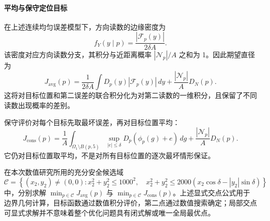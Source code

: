 \paragraph{平均与保守定位目标}
在上述连续均匀误差模型下，方向读数的边缘密度为
\begin{equation}
f_Y(y\mid p)=\frac{|\mathcal F_p(y)|}{2\delta A}.
\end{equation}
该密度对应方向读数分支，其积分与近距离概率 $|\mathcal N_p|/A$ 之和为 1。因此期望直径为
\begin{equation}
J_{\mathrm{avg}}(p)=\frac1{2\delta A}\int D_p(y)|\mathcal F_p(y)|\,dy
+\frac{|\mathcal N_p|}{A}D_N(p).
\label{eq:q2_mean_objective}
\end{equation}
这将对目标位置和第二误差的联合积分化为对第二读数的一维积分，且保留了不同读数出现概率的差别。

保守评价对每个目标先取最坏误差，再对目标位置平均：
\begin{equation}
J_{\mathrm{cons}}(p)=\frac1A\int_{\Omega_1\setminus B(p,5)}
\sup_{|e|\le\delta}D_p(\phi_p(g)+e)\,dg
+\frac{|\mathcal N_p|}{A}D_N(p).
\label{eq:q2_conservative_objective}
\end{equation}
它仍对目标位置取平均，不是对所有目标位置的逐次最坏情形保证。

在本次数值研究所用的充分安全候选域
\begin{equation}
\mathcal C=\left\{(x_2,y_2)\ne(0,0):x_2^2+y_2^2\le1000^2,\quad
x_2^2+y_2^2\le2000(x_2\cos\delta-|y_2|\sin\delta)\right\}
\end{equation}
中，分别求解 $\min_{p\in\mathcal C}J_{\mathrm{avg}}(p)$ 与 $\min_{p\in\mathcal C}J_{\mathrm{cons}}(p)$。上述显式交点公式用于边界几何计算，目标函数通过数值积分评价，第二点通过数值搜索确定；局部交点可显式求解并不意味着整个优化问题具有闭式解或唯一全局最优点。

